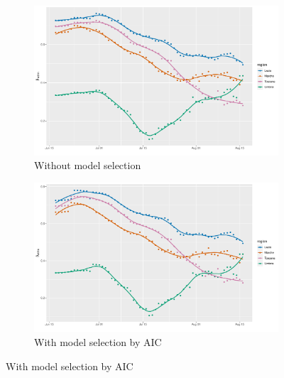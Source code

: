 \documentclass[12pt]{article}
\begin{document}
\begin{appendices}
		\begin{figure}[H]
    	    \centering
    	    \begin{subfigure}{\textwidth}
    	      \centering
    	      \includegraphics[width=0.95\linewidth]{output/model_within_lag14_betawithin_Centro (IT)_rolling.pdf}
    	      \caption{Without model selection}
    	      \label{fig:beta_within_over_time_centro_regular}
    	    \end{subfigure}\newline
    	    \begin{subfigure}{\textwidth}
    	      \centering
    	      \includegraphics[width=0.95\linewidth]{output/model_within_lag14_betawithin_Centro (IT)_aic_rolling.pdf}
    	      \caption{With model selection by AIC}
    	      \label{fig:beta_within_over_time_centro_aic}
    	    \end{subfigure}
    	\end{figure}
        \begin{figure}[H]\ContinuedFloat
    	    \begin{subfigure}{\textwidth}
    	      \centering

\end{subfigure}
\end{figure}
\end{appendices}
\end{document}
